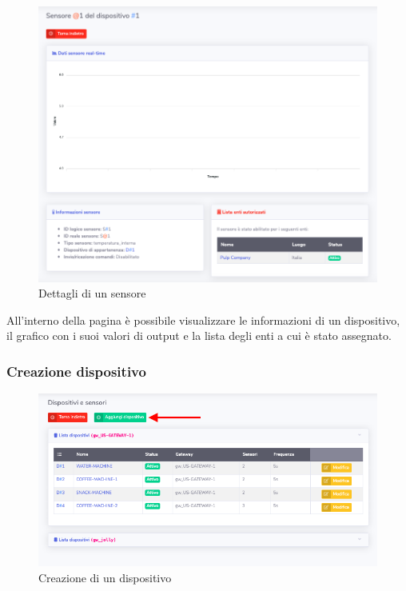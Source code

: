 		\begin{figure}[H]
		\centering
		\includegraphics[scale=0.600]{res/images/admin/dettSensore.png}
		\caption{Dettagli di un sensore}
	\end{figure}


		All'interno della pagina è possibile visualizzare le informazioni di un dispositivo, il grafico con i suoi valori di output e la lista degli enti a cui è stato assegnato.

	\subsubsection{Creazione dispositivo}

		\begin{figure}[H]
		\centering
		\includegraphics[scale=0.600]{res/images/admin/selCreazDisp.png}
		\caption{Creazione di un dispositivo}
	\end{figure}


